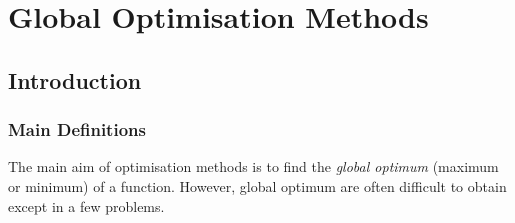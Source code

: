 
\chapter{Global Optimisation Methods}\label{Chapter:GlobalOpt}


\section{Introduction}\label{Chapter:GlobalOpt:Section:Introduction}

\subsection{Main Definitions}\label{Chapter:GlobalOpt:Section:Definitions}
The main aim of optimisation methods is to find the {\it global optimum} (maximum or minimum) of a function. However, global optimum are often difficult to obtain except in a few problems. 

